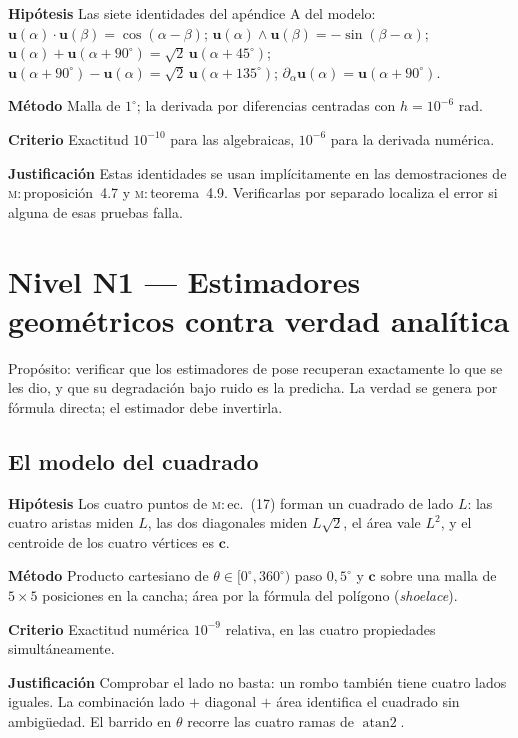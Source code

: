 \documentclass[11pt,a4paper]{article}
\newcommand{\uu}{\mathbf{u}}
\newcommand{\cc}{\mathbf{c}}
\newcommand{\atantwo}{\operatorname{atan2}}
\newcommand{\grados}{^{\circ}}
\newenvironment{prueba}[2]{%
  \par\medskip\noindent
  \begin{tcolorbox}[enhanced,breakable,colback=white,colframe=black!45,
    boxrule=0.5pt,arc=1pt,left=6pt,right=6pt,top=4pt,bottom=4pt,
    title={\bfseries #1\quad\normalfont #2},
    colbacktitle=black!8,coltitle=black,fonttitle=\bfseries\small]
  \small
}{\end{tcolorbox}\par\medskip}
\newcommand{\campo}[1]{\par\smallskip\noindent\textbf{#1}\quad\ignorespaces}
\begin{document}
\begin{prueba}{N0.8}{Identidades del marco fila-descendente}
\campo{Hipótesis} Las siete identidades del apéndice A del modelo:
$\uu(\alpha)\cdot\uu(\beta) = \cos(\alpha-\beta)$;
$\uu(\alpha)\wedge\uu(\beta) = -\sin(\beta-\alpha)$;
$\uu(\alpha)+\uu(\alpha+90\grados) = \sqrt2\,\uu(\alpha+45\grados)$;
$\uu(\alpha+90\grados)-\uu(\alpha) = \sqrt2\,\uu(\alpha+135\grados)$;
$\partial_\alpha \uu(\alpha) = \uu(\alpha+90\grados)$.
\campo{Método} Malla de $1\grados$; la derivada por diferencias centradas con
$h=10^{-6}$ rad.
\campo{Criterio} Exactitud $10^{-10}$ para las algebraicas, $10^{-6}$ para la derivada
numérica.
\campo{Justificación} Estas identidades se usan implícitamente en las demostraciones de
\textsc{m}:\,proposición~4.7 y \textsc{m}:\,teorema~4.9. Verificarlas por separado localiza el error si
alguna de esas pruebas falla.
\end{prueba}

\section{Nivel N1 --- Estimadores geométricos contra verdad analítica}

Propósito: verificar que los estimadores de pose recuperan exactamente lo que se les
dio, y que su degradación bajo ruido es la predicha. La verdad se genera por fórmula
directa; el estimador debe invertirla.

\subsection{El modelo del cuadrado}

\begin{prueba}{N1.1}{Parametrización vertical: propiedades métricas}
\campo{Hipótesis} Los cuatro puntos de \textsc{m}:\,ec.~(17) forman un cuadrado de lado $L$:
las cuatro aristas miden $L$, las dos diagonales miden $L\sqrt2$, el área vale $L^2$,
y el centroide de los cuatro vértices es $\cc$.
\campo{Método} Producto cartesiano de $\theta \in [0\grados,360\grados)$ paso
$0{,}5\grados$ y $\cc$ sobre una malla de $5\times5$ posiciones en la cancha; área por
la fórmula del polígono (\textit{shoelace}).
\campo{Criterio} Exactitud numérica $10^{-9}$ relativa, en las cuatro propiedades
simultáneamente.
\campo{Justificación} Comprobar el lado no basta: un rombo también tiene cuatro lados
iguales. La combinación lado $+$ diagonal $+$ área identifica el cuadrado sin
ambigüedad. El barrido en $\theta$ recorre las cuatro ramas de $\atantwo$.
\end{prueba}
\end{document}
